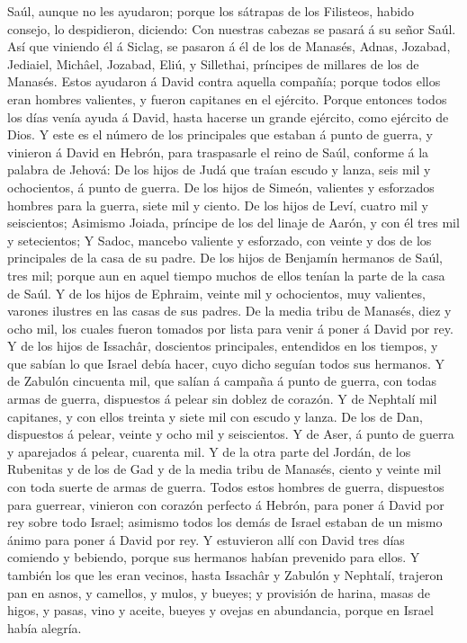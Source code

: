 Saúl, aunque no les ayudaron; porque los sátrapas de los Filisteos,
habido consejo, lo despidieron, diciendo: Con nuestras cabezas se pasará
á su señor Saúl.  Así que viniendo él á Siclag, se pasaron
á él de los de Manasés, Adnas, Jozabad, Jediaiel, Michâel, Jozabad,
Eliú, y Sillethai, príncipes de millares de los de Manasés.
 Estos ayudaron á David contra aquella compañía; porque
todos ellos eran hombres valientes, y fueron capitanes en el ejército.
 Porque entonces todos los días venía ayuda á David, hasta
hacerse un grande ejército, como ejército de Dios.  Y este
es el número de los principales que estaban á punto de guerra, y
vinieron á David en Hebrón, para traspasarle el reino de Saúl, conforme
á la palabra de Jehová:  De los hijos de Judá que traían
escudo y lanza, seis mil y ochocientos, á punto de guerra. 
De los hijos de Simeón, valientes y esforzados hombres para la guerra,
siete mil y ciento.  De los hijos de Leví, cuatro mil y
seiscientos;  Asimismo Joiada, príncipe de los del linaje
de Aarón, y con él tres mil y setecientos;  Y Sadoc,
mancebo valiente y esforzado, con veinte y dos de los principales de la
casa de su padre.  De los hijos de Benjamín hermanos de
Saúl, tres mil; porque aun en aquel tiempo muchos de ellos tenían la
parte de la casa de Saúl.  Y de los hijos de Ephraim,
veinte mil y ochocientos, muy valientes, varones ilustres en las casas
de sus padres.  De la media tribu de Manasés, diez y ocho
mil, los cuales fueron tomados por lista para venir á poner á David por
rey.  Y de los hijos de Issachâr, doscientos principales,
entendidos en los tiempos, y que sabían lo que Israel debía hacer, cuyo
dicho seguían todos sus hermanos.  Y de Zabulón cincuenta
mil, que salían á campaña á punto de guerra, con todas armas de guerra,
dispuestos á pelear sin doblez de corazón.  Y de Nephtalí
mil capitanes, y con ellos treinta y siete mil con escudo y lanza.
 De los de Dan, dispuestos á pelear, veinte y ocho mil y
seiscientos.  Y de Aser, á punto de guerra y aparejados á
pelear, cuarenta mil.  Y de la otra parte del Jordán, de
los Rubenitas y de los de Gad y de la media tribu de Manasés, ciento y
veinte mil con toda suerte de armas de guerra.  Todos estos
hombres de guerra, dispuestos para guerrear, vinieron con corazón
perfecto á Hebrón, para poner á David por rey sobre todo Israel;
asimismo todos los demás de Israel estaban de un mismo ánimo para poner
á David por rey.  Y estuvieron allí con David tres días
comiendo y bebiendo, porque sus hermanos habían prevenido para ellos.
 Y también los que les eran vecinos, hasta Issachâr y
Zabulón y Nephtalí, trajeron pan en asnos, y camellos, y mulos, y
bueyes; y provisión de harina, masas de higos, y pasas, vino y aceite,
bueyes y ovejas en abundancia, porque en Israel había alegría.

